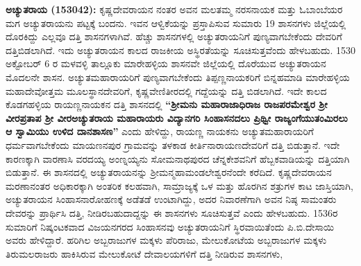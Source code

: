 \textbf{ಅಚ್ಯುತರಾಯ (1530\general{\enginline{-}}42):} ಕೃಷ್ಣದೇವರಾಯನ ನಂತರ ಅವನ ಮಲತಮ್ಮ ನರಸನಾಯಕ ಮತ್ತು ಓಬಾಂಬೆಯರ ಮಗ ಅಚ್ಯುತರಾಯನು ಪಟ್ಟಕ್ಕೆ ಬಂದನು. ಇವನ ಆಳ್ವಿಕೆಯನ್ನು ಪ್ರಸ್ತಾಪಿಸುವ ಸುಮಾರು 19 ಶಾಸನಗಳು ಜಿಲ್ಲೆಯಲ್ಲಿ ದೊರಕಿದ್ದು ಎಲ್ಲವೂ ದತ್ತಿ ಶಾಸನಗಳಾಗಿವೆ. ಹೆಚ್ಚು ಶಾಸನಗಳಲ್ಲಿ ಅಚ್ಯುತರಾಯನಿಗೆ ಪುಣ್ಯವಾಗಬೇಕೆಂದು ದೇವರಿಗೆ ದತ್ತಿಬಿಡಲಾಗಿದೆ. ಇದು ಅಚ್ಯುತರಾಯನ ಕಾಲದ ರಾಜಕೀಯ ಅಸ್ಥಿರತೆಯನ್ನು ಸೂಚಿಸುತ್ತವೆಂದು ಹೇಳಬಹುದು. 1530 ಅಕ್ಟೋಬರ್​ 6 ರ ಮಳವಳ್ಳಿ ತಾಲ್ಲೂಕು ಮಾರೇಹಳ್ಳಿಯ ಶಾಸನವೇ ಜಿಲ್ಲೆಯಲ್ಲಿ ದೊರೆಯುವ ಅಚ್ಯುತರಾಯನ ಮೊದಲನೇ ಶಾಸನ. ಅಚ್ಯುತಮಹಾರಾಯರಿಗೆ ಪುಣ್ಯವಾಗಬೇಕೆಂದು ತಿಪ್ಪಣ್ಣನಾಯಕರಿಗೆ ಬಿನ್ನಹಮಾಡಿ ಮಾರೇಹಳ್ಳಿಯ ಮಹಾದೇವೋತ್ತಮ ಮೂಲಸ್ಥಾನದೇವರಿಗೆ, ಕೃಷ್ಣವೇಣಿತೀರದಲ್ಲಿ ಗದ್ದೆಯನ್ನು ದತ್ತಿ ಬಿಡಲಾಗಿದೆ. ಇದೇ ಕಾಲದ ಕೊಡಗಹಳ್ಳಿಯ ರಾಯಣ್ಣನಾಯಕನ ದತ್ತಿ ಶಾಸನದಲ್ಲಿ \textbf{“ಶ‍್ರೀಮನು ಮಹಾರಾಜಾಧಿರಾಜ ರಾಜಪರಮೇಶ್ವರ ಶ‍್ರೀ ವೀರಪ್ರತಾಪ ಶ‍್ರೀ ವೀರಅಚ್ಯುತರಾಯ ಮಹಾರಾಯರು ವಿದ್ಯಾನಗರಿ ಸಿಂಹಾಸನದಲು ಪ್ರಿಥ್ವೀ ರಾಜ್ಯಂಗೆಯುತಂಮಿರಲು ಆ ಸ್ವಾಮಿಯು ಉಳಿದ ದಾನಶಾಸಣ”} ಎಂದು ಹೇಳಿದ್ದು, ರಾಯಣ್ಣ ನಾಯಕನು ಅಚ್ಯುತಮಹಾರಾಯರಿಗೆ ಧರ್ಮವಾಗಬೇಕೆಂದು ಮಾಯಣನಪುರ ಗ್ರಾಮವನ್ನು ತಳಕಾಡ ಕೀರ್ತಿನಾರಾಯಣದೇವರಿಗೆ ದತ್ತಿ ಬಿಡುತ್ತಾನೆ. ಇದೇ ಕಾರಣಕ್ಕಾಗಿ ವಾರಣಾಸಿ ವರದಯ್ಯ ಅಂಣ್ನಯ್ಯನು ಸೋಮನಾಥಪುರದ ಚೆನ್ನಕೇಶವನಿಗೆ ಹೆಬ್ಬಕವಾಡಿಯನ್ನು ದತ್ತಿಯಾಗಿ ಬಿಡುತ್ತಾನೆ. ಈ ಶಾಸನದಲ್ಲಿ ಅಚ್ಯುತರಾಯನನ್ನು ಶ‍್ರೀಮನ್ಮಹಾಮಂಡಲೇಶ್ವರನೆಂದೇ ಕರೆದಿದೆ. ಕೃಷ್ಣದೇವರಾಯನ ಮರಣಾನಂತರ ಅಧಿಕಾರಕ್ಕಾಗಿ ಅಂತರಿಕ ಕಲಹವಾಗಿ, ಸಾಮ್ರಾಜ್ಯಕ್ಕೆ ಒಳ ಮತ್ತು ಹೊರಗಿನ ಶತ್ರುಗಳ ಕಾಟ ಜಾಸ್ತಿಯಾಗಿ, ಅಚ್ಯುತರಾಯನ ಸಿಂಹಾಸನಾರೋಹಣಕ್ಕೆ ಅಡೆತಡೆ ಉಂಟಾಗಿದ್ದು, ಅದರ ನಿವಾರಣೆಗಾಗಿ ಅವನ ನಿಷ್ಠ ಸಾಮಂತರು ದೇವರನ್ನು ಪ್ರಾರ್ಥಿಸಿ ದತ್ತಿ, ನೀಡಿರಬಹುದಾದ್ದನ್ನು ಈ ಶಾಸನಗಳು ಸೂಚಿಸುತ್ತವೆ ಎಂದು ಹೇಳಬಹುದು. 1536ರ ಸುಮಾರಿಗೆ ನಿಷ್ಕಂಟಕವಾದ ವಿಜಯನಗರದ ಸಿಂಹಾಸನವು ಅಚ್ಯುತರಾಯನಿಗೆ ಸ್ಥಿರವಾಯಿತೆಂದು ಪಿ.ಬಿ.ದೇಸಾಯಿ ಅವರು ಹೇಳಿದ್ದಾರೆ. ಹರಿಗಿಲ ಅಬ್ಬರಾಜುಗಳ ಮಕ್ಕಳು ಪೆರಿರಾಜು, ಮೇಲುಕೋಟೆಯ ಅಬ್ಬರಾಜುಗಳ ಮಕ್ಕಳು ತಿರುಮಲರಾಜರು ಹಾಕಿಸಿರುವ ಮೇಲುಕೋಟೆ ದೇವಾಲಯಗಳಿಗೆ ದತ್ತಿ ನೀಡಿರುವ ಶಾಸನಗಳು,
